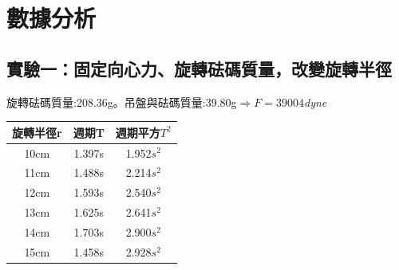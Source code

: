 \documentclass[12pt]{article}
\begin{document}


\section{\textbf{數據分析}}
\subsection{\textbf{實驗一}：固定向心力、旋轉砝碼質量，改變旋轉半徑}
旋轉砝碼質量:208.36g。吊盤與砝碼質量:39.80g$\Rightarrow{F=39004}$\textit{dyne}

\begin{table}[h]
\centering
\begin{tabular}{ccc}
\hline
旋轉半徑r & 週期T    & 週期平方$T^2$  \\ \hline
10cm  & 1.397s & 1.952$s^2$ \\
11cm  & 1.488s & 2.214$s^2$ \\
12cm  & 1.593s & 2.540$s^2$ \\
13cm  & 1.625s & 2.641$s^2$ \\
14cm  & 1.703s & 2.900$s^2$ \\
15cm  & 1.458s & 2.928$s^2$ \\ \hline
\end{tabular}
\end{table}
\end{document}
